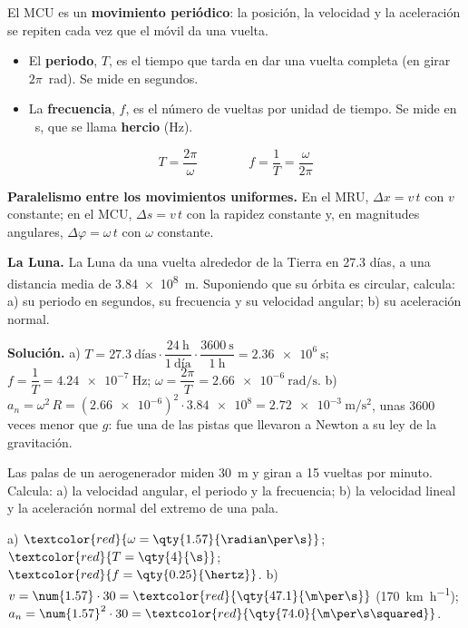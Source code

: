 El MCU es un \textbf{movimiento periódico}: la posición, la velocidad y la aceleración se repiten cada vez que el móvil da una vuelta.
\begin{itemize}
    \item El \textbf{periodo}, \(T\), es el tiempo que tarda en dar una vuelta completa (en girar \(2\pi\)~rad). Se mide en segundos.
    \item La \textbf{frecuencia}, \(f\), es el número de vueltas por unidad de tiempo. Se mide en \unit{\per\s}, que se llama
    \textbf{hercio} (Hz).
\end{itemize}
\[ \boxed{T = \frac{2\pi}{\omega}} \qquad\qquad \boxed{f = \frac{1}{T} = \frac{\omega}{2\pi}} \]

\begin{remark}
    \textbf{Paralelismo entre los movimientos uniformes.} En el MRU, \(\Delta x = v\,t\) con \(v\) constante; en el MCU,
    \(\Delta s = v\,t\) con la rapidez constante y, en magnitudes angulares, \(\Delta\varphi = \omega\,t\) con \(\omega\) constante.
\end{remark}

\begin{example}
    \textbf{La Luna.} La Luna da una vuelta alrededor de la Tierra en \num{27.3} días, a una distancia media de
    \qty{3.84e8}{\m}. Suponiendo que su órbita es circular, calcula: a) su periodo en segundos, su frecuencia y su velocidad angular;
    b) su aceleración normal.

    \textbf{Solución.} a) \(T = \num{27.3}~\text{días} \cdot \dfrac{\qty{24}{\hour}}{1~\text{día}} \cdot \dfrac{\qty{3600}{\s}}{\qty{1}{\hour}} =
    \qty{2.36e6}{\s}\); \(f = \dfrac{1}{T} = \qty{4.24e-7}{\hertz}\); \(\omega = \dfrac{2\pi}{T} = \qty{2.66e-6}{\radian\per\s}\).
    b) \(a_n = \omega^2\,R = (\num{2.66e-6})^2 \cdot \num{3.84e8} = \qty{2.72e-3}{\m\per\s\squared}\), unas \num{3600} veces menor que
    \(g\): fue una de las pistas que llevaron a Newton a su ley de la gravitación.
\end{example}

\begin{exercise}
    Las palas de un aerogenerador miden \qty{30}{\m} y giran a 15 vueltas por minuto. Calcula: a) la velocidad angular, el periodo y
    la frecuencia; b) la velocidad lineal y la aceleración normal del extremo de una pala.
    \begin{solu}
        a) \(\textcolor{red}{\omega = \qty{1.57}{\radian\per\s}}\); \(\textcolor{red}{T = \qty{4}{\s}}\); \(\textcolor{red}{f = \qty{0.25}{\hertz}}\).
        b) \(v = \num{1.57} \cdot 30 = \textcolor{red}{\qty{47.1}{\m\per\s}}\) (\qty{170}{\km\per\hour}); \(a_n = \num{1.57}^2 \cdot 30 =
        \textcolor{red}{\qty{74.0}{\m\per\s\squared}}\).
    \end{solu}
\end{exercise}

